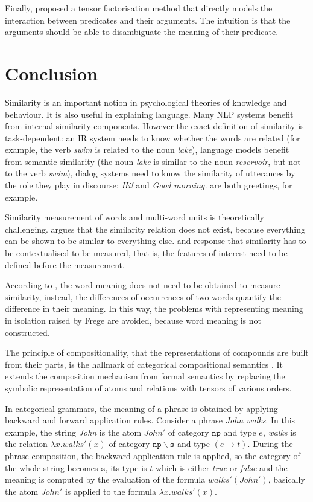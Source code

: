 Finally, \citet{hashimoto-tsuruoka:2015:CVSC,hashimoto-EtAl:2014:EMNLP2014} proposed a tensor factorisation method that directly models the interaction between predicates and their arguments. The intuition is that the arguments should be able to disambiguate the meaning of their predicate.

\section{Conclusion}
\label{sec:conclusion-background}

Similarity is an important notion in psychological theories of knowledge and behaviour. It is also useful in explaining language. Many NLP systems benefit from internal similarity components. However the exact definition of similarity is task-dependent: an IR system needs to know whether the words are related (for example, the verb \textit{swim} is related to the noun \textit{lake}), language models benefit from semantic similarity (the noun \textit{lake} is similar to the noun \textit{reservoir}, but not to the verb \textit{swim}), dialog systems need to know the similarity of utterances by the role they play in  discourse: \textit{Hi!} and \textit{Good morning.} are both greetings, for example.

Similarity measurement of words and multi-word units is theoretically challenging.  argues that the similarity relation does not exist, because everything can be shown to be similar to everything else.  and  response that similarity has to be contextualised to be measured, that is, the features of interest need to be defined before the measurement.

According to , the word meaning does not need to be obtained to measure similarity, instead, the differences of occurrences of two words quantify the difference in their meaning. In this way, the problems with representing meaning in isolation raised by Frege are avoided, because word meaning is not constructed.

The principle of compositionality, that the representations of compounds are built from their parts, is the hallmark of categorical compositional semantics \cite{DBLP:journals/corr/abs-1003-4394}. It extends the composition mechanism from formal semantics by replacing the symbolic representation of atoms and relations with tensors of various orders.

In categorical grammars, the meaning of a phrase is obtained by applying backward and forward application rules. Consider a phrase \textit{John walks}. In this example, the string \textit{John} is the atom $\mathit{John'}$ of category $\mathtt{np}$ and type $e$, \textit{walks} is the relation $\lambda x.\mathit{walks'}(x)$ of category $\mathtt{np\backslash{}s}$ and type $(e \to t)$. During the phrase composition, the backward application rule is applied, so the category of the whole string becomes $\mathtt{s}$, its type is $t$ which is either \textit{true} or \textit{false} and the meaning is computed by the evaluation of the formula $\mathit{walks'}(\mathit{John'})$, basically the atom $\mathit{John'}$ is applied to the formula $\lambda x.\mathit{walks'(x)}$.

